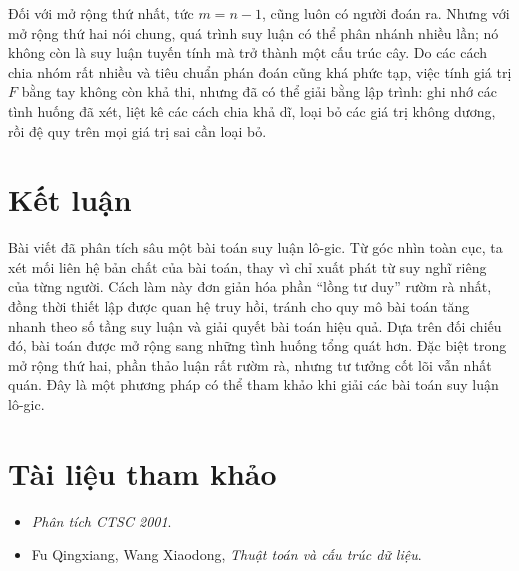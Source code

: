 \documentclass[11pt]{article}
\begin{document}
Đối với mở rộng thứ nhất, tức \(m=n-1\), cũng luôn có người đoán ra. Nhưng
với mở rộng thứ hai nói chung, quá trình suy luận có thể phân nhánh nhiều
lần; nó không còn là suy luận tuyến tính mà trở thành một cấu trúc cây. Do
các cách chia nhóm rất nhiều và tiêu chuẩn phán đoán cũng khá phức tạp, việc
tính giá trị \(F\) bằng tay không còn khả thi, nhưng đã có thể giải bằng lập
trình: ghi nhớ các tình huống đã xét, liệt kê các cách chia khả dĩ, loại bỏ
các giá trị không dương, rồi đệ quy trên mọi giá trị sai cần loại bỏ.

\section*{Kết luận}

Bài viết đã phân tích sâu một bài toán suy luận lô-gic. Từ góc nhìn toàn
cục, ta xét mối liên hệ bản chất của bài toán, thay vì chỉ xuất phát từ suy
nghĩ riêng của từng người. Cách làm này đơn giản hóa phần ``lồng tư duy''
rườm rà nhất, đồng thời thiết lập được quan hệ truy hồi, tránh cho quy mô bài
toán tăng nhanh theo số tầng suy luận và giải quyết bài toán hiệu quả. Dựa
trên đối chiếu đó, bài toán được mở rộng sang những tình huống tổng quát hơn.
Đặc biệt trong mở rộng thứ hai, phần thảo luận rất rườm rà, nhưng tư tưởng
cốt lõi vẫn nhất quán. Đây là một phương pháp có thể tham khảo khi giải các
bài toán suy luận lô-gic.

\section*{Tài liệu tham khảo}

\begin{itemize}
  \item \emph{Phân tích CTSC 2001}.
  \item Fu Qingxiang, Wang Xiaodong, \emph{Thuật toán và cấu trúc dữ liệu}.
\end{itemize}
\end{document}
